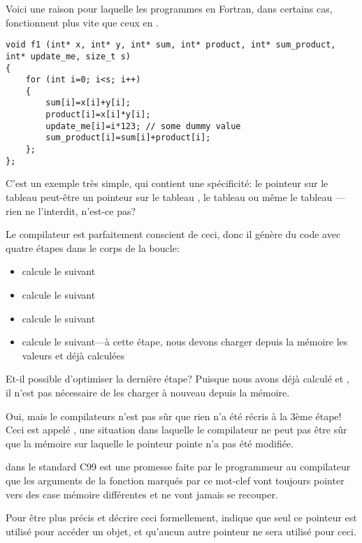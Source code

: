 
Voici une raison pour laquelle les programmes en Fortran, dans certains cas, fonctionnent
plus vite que ceux en \CCpp.

\begin{lstlisting}[style=customc]
void f1 (int* x, int* y, int* sum, int* product, int* sum_product, int* update_me, size_t s)
{
	for (int i=0; i<s; i++)
	{
		sum[i]=x[i]+y[i];
		product[i]=x[i]*y[i];
		update_me[i]=i*123; // some dummy value
		sum_product[i]=sum[i]+product[i];	
	};
};
\end{lstlisting}

C'est un exemple très simple, qui contient une spécificité:
le pointeur sur le tableau  peut-être un pointeur sur le tableau
, le tableau  ou même le tableau ---rien
ne l'interdit, n'est-ce pas?

Le compilateur est parfaitement conscient de ceci, donc il génère du code avec quatre
étapes dans le corps de la boucle:
\begin{itemize}
\item calcule le  suivant
\item calcule le  suivant
\item calcule le  suivant
\item calcule le  suivant---à cette étape, nous devons charger
depuis la mémoire les valeurs  et  déjà calculées
\end{itemize}

Et-il possible d'optimiser la dernière étape?
Puisque nous avons déjà calculé  et , il n'est pas nécessaire
de les charger à nouveau depuis la mémoire.

Oui, mais le compilateurs n'est pas sûr que rien n'a été récris à la 3ème étape!
Ceci est appelé ,
une situation dans laquelle le compilateur ne peut pas être sûr que la mémoire sur
laquelle le pointeur pointe n'a pas été modifiée.

 dans le standard C99 
est une promesse faite par le programmeur au compilateur que les arguments de la
fonction marqués par ce mot-clef vont toujours pointer vers des case mémoire différentes
et ne vont jamais se recouper.

Pour être plus précis et décrire ceci formellement,  indique que seul
ce pointeur est utilisé pour accéder un objet, et qu'aucun autre pointeur ne sera
utilisé pour ceci.

